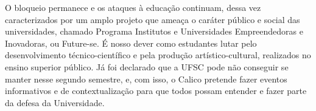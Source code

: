 \documentclass{article}
\begin{document}
O bloqueio permanece e os ataques à educação continuam, dessa vez caracterizados por um amplo projeto que ameaça o caráter público e social das universidades, chamado Programa Institutos e Universidades Empreendedoras e Inovadoras, ou Future-se. É nosso dever como estudantes lutar pelo desenvolvimento técnico-científico e pela produção artístico-cultural, realizados no ensino superior público. Já foi declarado que a UFSC pode não conseguir se manter nesse segundo semestre, e, com isso, o Calico pretende fazer eventos informativos e de contextualização para que todos possam entender e fazer parte da defesa da Universidade. 

\clearpage



\thispagestyle{empty}

\end{document}
